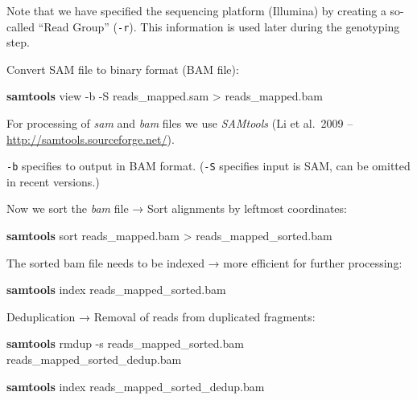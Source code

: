 \documentclass[
  letterpaper,
]{book}
\newenvironment{Shaded}{}{}
\newcommand{\AttributeTok}[1]{\textcolor[rgb]{0.84,0.23,0.29}{#1}}
\newcommand{\ExtensionTok}[1]{\textcolor[rgb]{0.84,0.23,0.29}{\textbf{#1}}}
\newcommand{\NormalTok}[1]{\textcolor[rgb]{0.14,0.16,0.18}{#1}}
\newcommand{\OperatorTok}[1]{\textcolor[rgb]{0.14,0.16,0.18}{#1}}
\begin{document}
Note that we have specified the sequencing platform (Illumina) by
creating a so-called ``Read Group'' (\texttt{-r}). This information is
used later during the genotyping step.

Convert SAM file to binary format (BAM file):

\begin{Shaded}
\begin{Highlighting}[]
\ExtensionTok{samtools}\NormalTok{ view }\AttributeTok{{-}b} \AttributeTok{{-}S}\NormalTok{ reads\_mapped.sam }\OperatorTok{\textgreater{}}\NormalTok{ reads\_mapped.bam}
\end{Highlighting}
\end{Shaded}

For processing of \emph{sam} and \emph{bam} files we use \emph{SAMtools}
(Li et al.~2009 -- \url{http://samtools.sourceforge.net/}).

\texttt{-b} specifies to output in BAM format. (\texttt{-S} specifies
input is SAM, can be omitted in recent versions.)

Now we sort the \emph{bam} file → Sort alignments by leftmost
coordinates:

\begin{Shaded}
\begin{Highlighting}[]
\ExtensionTok{samtools}\NormalTok{ sort reads\_mapped.bam }\OperatorTok{\textgreater{}}\NormalTok{ reads\_mapped\_sorted.bam}
\end{Highlighting}
\end{Shaded}

The sorted bam file needs to be indexed → more efficient for further
processing:

\begin{Shaded}
\begin{Highlighting}[]
\ExtensionTok{samtools}\NormalTok{ index reads\_mapped\_sorted.bam}
\end{Highlighting}
\end{Shaded}

Deduplication → Removal of reads from duplicated fragments:

\begin{Shaded}
\begin{Highlighting}[]
\ExtensionTok{samtools}\NormalTok{ rmdup }\AttributeTok{{-}s}\NormalTok{ reads\_mapped\_sorted.bam reads\_mapped\_sorted\_dedup.bam}
\end{Highlighting}
\end{Shaded}

\begin{Shaded}
\begin{Highlighting}[]
\ExtensionTok{samtools}\NormalTok{ index reads\_mapped\_sorted\_dedup.bam}
\end{Highlighting}
\end{Shaded}
\end{document}
